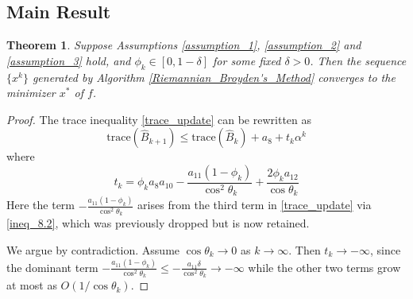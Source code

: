 \documentclass[12pt,a4paper,draft]{article}  %
\newtheorem{theorem}{Theorem}[section]
\theoremstyle{definition}
\numberwithin{equation}{section}
\begin{document}
\subsection{Main Result}
\begin{theorem}\label{main_result}
        Suppose Assumptions \ref{assumption_1}, \ref{assumption_2} and \ref{assumption_3} hold, and $\phi_k\in [0,1-\delta]$ for some fixed $\delta>0$. Then the sequence $\{x^k\}$ generated by Algorithm \ref{Riemannian_Broyden's_Method} converges to the minimizer $x^\ast$ of $f$.
\end{theorem}
\begin{proof}
        The trace inequality \eqref{trace_update} can be rewritten as
        \begin{equation}\label{trace_refined}
                \mathrm{trace}(\hat{B}_{k+1}) \leq \mathrm{trace}(\hat{B}_k) + a_8 + t_k\alpha^k
        \end{equation}
        where
        \[
        t_k = \phi_k a_8 a_{10} - \frac{a_{11}(1-\phi_k)}{\cos^2\theta_k} + \frac{2\phi_k a_{12}}{\cos\theta_k}
        \]
        Here the term $-\frac{a_{11}(1-\phi_k)}{\cos^2\theta_k}$ arises from the third term in \eqref{trace_update} via \eqref{ineq_8.2}, which was previously dropped but is now retained.

        We argue by contradiction. Assume $\cos\theta_k \to 0$ as $k\to\infty$. Then $t_k \to -\infty$, since the dominant term $-\frac{a_{11}(1-\phi_k)}{\cos^2\theta_k}\leq -\frac{a_{11}\delta}{\cos^2\theta_k}\to -\infty$ while the other two terms grow at most as $O(1/\cos\theta_k)$.
        

\end{proof}
\end{document}
